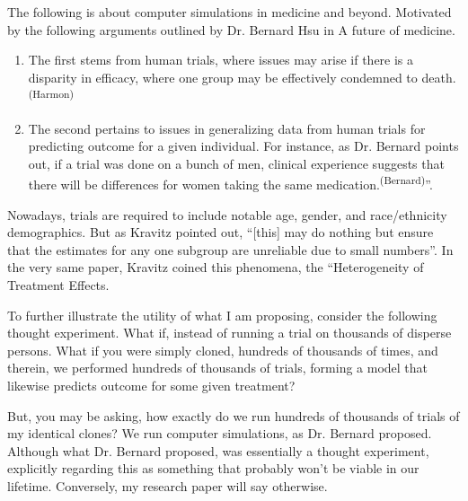 


The following is about computer simulations in medicine and beyond. Motivated by the following arguments outlined by Dr. Bernard Hsu in A future of medicine.


\begin{enumerate}
    \item The first stems from human trials, where issues may arise if there is a disparity in efficacy, where one group may be effectively condemned to death.\textsuperscript{(Harmon)}
     
    \item The second pertains to issues in generalizing data from human trials for predicting outcome for a given individual. For instance, as Dr. Bernard points out, if a trial was done on a bunch of men, clinical experience suggests that there will be differences for women taking the same medication.\textsuperscript{(Bernard)}''. 
\end{enumerate}

Nowadays, trials are required to include notable age, gender, and race/ethnicity demographics. But as Kravitz pointed out, ``[this] may do nothing but ensure that the estimates for any one subgroup are unreliable due to small numbers''. In the very same paper, Kravitz coined this phenomena, the ``Heterogeneity of Treatment Effects. 

To further illustrate the utility of what I am proposing, consider the following thought experiment. What if, instead of running a trial on thousands of disperse persons. What if you were simply cloned, hundreds of thousands of times, and therein, we performed hundreds of thousands of trials, forming a model that likewise predicts outcome for some given treatment?

But, you may be asking, how exactly do we run hundreds of thousands of trials of my identical clones? We run computer simulations, as Dr. Bernard proposed. Although what Dr. Bernard proposed, was essentially a thought experiment, explicitly regarding this as something that probably won't be viable in our lifetime. Conversely, my research paper will say otherwise.

